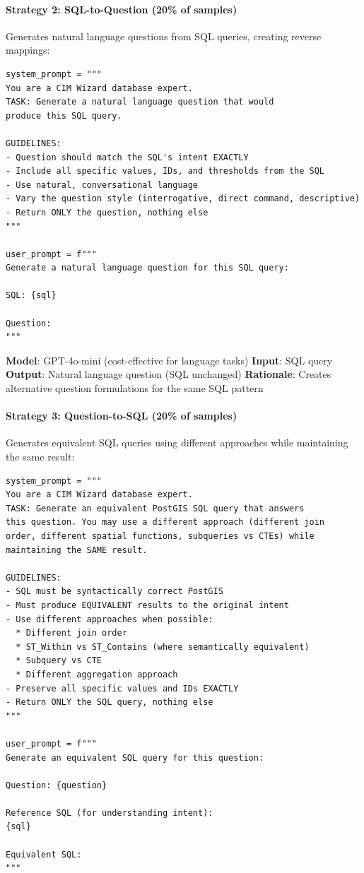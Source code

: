 \paragraph{Strategy 2: SQL-to-Question (20\% of samples)}

Generates natural language questions from SQL queries, creating reverse mappings:

\begin{lstlisting}[style=pythonstyle, caption=SQL-to-question generation strategy]
system_prompt = """
You are a CIM Wizard database expert.
TASK: Generate a natural language question that would 
produce this SQL query.

GUIDELINES:
- Question should match the SQL's intent EXACTLY
- Include all specific values, IDs, and thresholds from the SQL
- Use natural, conversational language
- Vary the question style (interrogative, direct command, descriptive)
- Return ONLY the question, nothing else
"""

user_prompt = f"""
Generate a natural language question for this SQL query:

SQL: {sql}

Question:
"""
\end{lstlisting}

\textbf{Model}: GPT-4o-mini (cost-effective for language tasks)
\textbf{Input}: SQL query
\textbf{Output}: Natural language question (SQL unchanged)
\textbf{Rationale}: Creates alternative question formulations for the same SQL pattern

\paragraph{Strategy 3: Question-to-SQL (20\% of samples)}

Generates equivalent SQL queries using different approaches while maintaining the same result:

\begin{lstlisting}[style=pythonstyle, caption=Question-to-SQL equivalent generation]
system_prompt = """
You are a CIM Wizard database expert.
TASK: Generate an equivalent PostGIS SQL query that answers 
this question. You may use a different approach (different join 
order, different spatial functions, subqueries vs CTEs) while 
maintaining the SAME result.

GUIDELINES:
- SQL must be syntactically correct PostGIS
- Must produce EQUIVALENT results to the original intent
- Use different approaches when possible:
  * Different join order
  * ST_Within vs ST_Contains (where semantically equivalent)
  * Subquery vs CTE
  * Different aggregation approach
- Preserve all specific values and IDs EXACTLY
- Return ONLY the SQL query, nothing else
"""

user_prompt = f"""
Generate an equivalent SQL query for this question:

Question: {question}

Reference SQL (for understanding intent):
{sql}

Equivalent SQL:
"""
\end{lstlisting}

